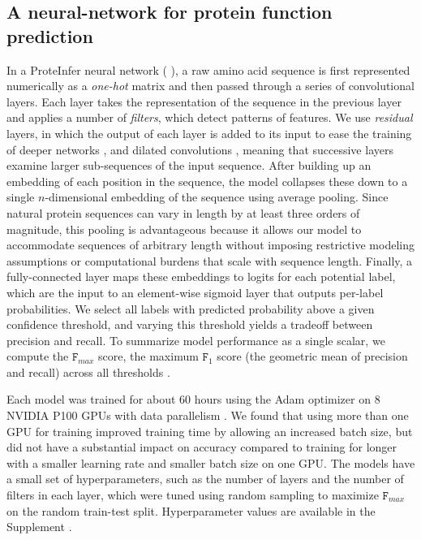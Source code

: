 \subsection*{A neural-network for protein function prediction}
In a ProteInfer neural network (%
), a raw amino acid sequence is first represented numerically as a \textit{one-hot} matrix and then passed through a series of convolutional layers. Each layer takes the representation of the sequence in the previous layer and applies a number of \textit{filters}, which detect patterns of features. We use \textit{residual} layers, in which the output of each layer is added to its input to ease the training of deeper networks \cite{resnet}, and dilated convolutions \cite{dilatedconvolutions}, meaning that successive layers examine larger sub-sequences of the input sequence. After building up an embedding of each position in the sequence, the model collapses these down to a single $n$-dimensional embedding of the sequence using average pooling. Since natural protein sequences can vary in length by at least three orders of magnitude, this pooling is advantageous because it allows our model to accommodate sequences of arbitrary length without imposing restrictive modeling assumptions or computational burdens that scale with sequence length. Finally, a fully-connected layer maps these embeddings to logits for each potential label, which are the input to an element-wise sigmoid layer that outputs per-label probabilities. 
We select all labels with predicted probability above a given confidence threshold, and varying this threshold yields a tradeoff between precision and recall. To summarize model performance as a single scalar, we compute the $\texttt{F}_{max}$ score, the maximum $\texttt{F}_{1}$ score (the geometric mean of precision and recall) across all thresholds \citep{radivojac2013large}.  

Each model was trained for about 60 hours using the Adam optimizer \citep{kingma2014adam} on 8 NVIDIA P100 GPUs with data parallelism \cite{dean2012large, dataparalellism}.  We found that using more than one GPU for training improved training time by allowing an increased batch size, but did not have a substantial impact on accuracy compared to training for longer with a smaller learning rate and smaller batch size on one GPU. The models have a small set of hyperparameters, such as the number of layers and the number of filters in each layer, which were tuned using random sampling to maximize $\texttt{F}_{max}$ on the random train-test split. Hyperparameter values are available in the \textnormal{ Supplement}%
.
